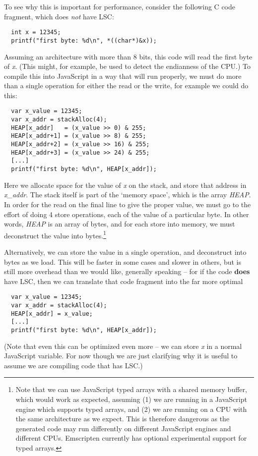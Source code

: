 \documentclass[11pt]{proc}
\begin{document}
To see why this is important for performance, consider the following
C code fragment, which does \emph{not} have LSC:
\begin{verbatim}
  int x = 12345;
  printf("first byte: %d\n", *((char*)&x));
\end{verbatim}
Assuming an architecture with more than 8 bits, this code will read
the first byte of \emph{x}. (This might, for example, be used to detect the
endianness of the CPU.) To compile this into JavaScript in
a way that will run properly, we must do more than a single operation
for either the read or the write, for example we could do this:
\begin{verbatim}
  var x_value = 12345;
  var x_addr = stackAlloc(4);
  HEAP[x_addr]   = (x_value >> 0) & 255;
  HEAP[x_addr+1] = (x_value >> 8) & 255;
  HEAP[x_addr+2] = (x_value >> 16) & 255;
  HEAP[x_addr+3] = (x_value >> 24) & 255;
  [...]
  printf("first byte: %d\n", HEAP[x_addr]);
\end{verbatim}
Here we allocate space for the value of \emph{x} on the stack, and
store that address in \emph{x\_addr}. The stack itself is part of
the `memory space', which is the array \emph{HEAP}. In order for
the read on the final line to give the proper value, we must go to
the effort of doing 4 store operations, each of the value of a
particular byte. In other words, \emph{HEAP} is an array of bytes,
and for each store into memory, we must deconstruct the value into
bytes.\footnote{Note that we can use JavaScript typed arrays with a shared memory
buffer, which would work as expected, assuming (1) we are running
in a JavaScript engine which supports typed arrays, and (2) we
are running on a CPU with the same architecture as we expect. This
is therefore dangerous as the generated code may run differently on
different JavaScript engines and different CPUs.
Emscripten currently has optional experimental support for typed arrays.}

Alternatively, we can store the value in a single operation, and
deconstruct into bytes as we load. This will be faster in some
cases and slower in others, but is still more overhead
than we would like, generally speaking -- for if the code \textbf{does} have
LSC, then we can translate that code fragment into
the far more optimal
\begin{verbatim}
  var x_value = 12345;
  var x_addr = stackAlloc(4);
  HEAP[x_addr] = x_value;
  [...]
  printf("first byte: %d\n", HEAP[x_addr]);
\end{verbatim}
(Note that even this can be optimized even more -- we can store
\emph{x} in a normal JavaScript variable. For now though we are
just clarifying why it is useful to assume we are compiling code
that has LSC.)
\end{document}
